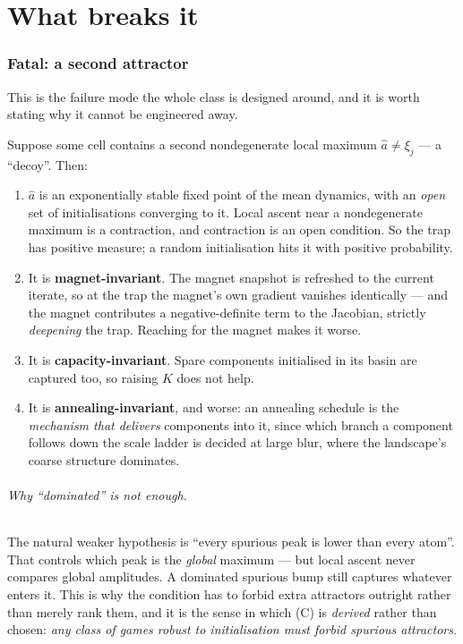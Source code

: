 \documentclass[11pt]{article}
\theoremstyle{definition}
\begin{document}
\part{What breaks it}

\section{Fatal: a second attractor}\label{sec:fatal}

This is the failure mode the whole class is designed around, and it is worth
stating why it cannot be engineered away.

Suppose some cell contains a second nondegenerate local maximum $\hat a \ne \xi_j$
--- a ``decoy''. Then:

\begin{enumerate}[leftmargin=1.8em, itemsep=3pt]
\item[(i)] $\hat a$ is an exponentially stable fixed point of the mean dynamics,
  with an \emph{open} set of initialisations converging to it. Local ascent near
  a nondegenerate maximum is a contraction, and contraction is an open condition.
  So the trap has positive measure; a random initialisation hits it with positive
  probability.
\item[(ii)] It is \textbf{magnet-invariant}. The magnet snapshot is refreshed to
  the current iterate, so at the trap the magnet's own gradient vanishes
  identically --- and the magnet contributes a negative-definite term to the
  Jacobian, strictly \emph{deepening} the trap. Reaching for the magnet makes it
  worse.
\item[(iii)] It is \textbf{capacity-invariant}. Spare components initialised in
  its basin are captured too, so raising $K$ does not help.
\item[(iv)] It is \textbf{annealing-invariant}, and worse: an annealing schedule
  is the \emph{mechanism that delivers} components into it, since which branch a
  component follows down the scale ladder is decided at large blur, where the
  landscape's coarse structure dominates.
\end{enumerate}

\paragraph{Why ``dominated'' is not enough.} The natural weaker hypothesis is
``every spurious peak is lower than every atom''. That controls which peak is the
\emph{global} maximum --- but local ascent never compares global amplitudes. A
dominated spurious bump still captures whatever enters it. This is why the
condition has to forbid extra attractors outright rather than merely rank them,
and it is the sense in which (C) is \emph{derived} rather than chosen: \emph{any
class of games robust to initialisation must forbid spurious attractors}.
\end{document}
